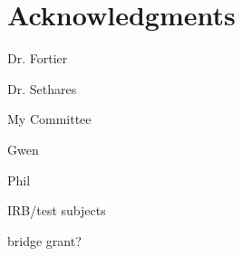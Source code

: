 \documentclass{umthesis}
\begin{document}
\chapter*{Acknowledgments}             %
  Dr. Fortier
  
  Dr. Sethares
  
  My Committee
  
  Gwen
  
  Phil
  
  IRB/test subjects
  
  bridge grant?



\cleardoublepage
{}




\clearpage
\tableofcontents				 %
\clearpage
{}
{}
\listoffigures                  %



\mainmatter   %



\def \spo2{ \texorpdfstring{SpO$_{2}$}{SpO2}}









\end{document}
